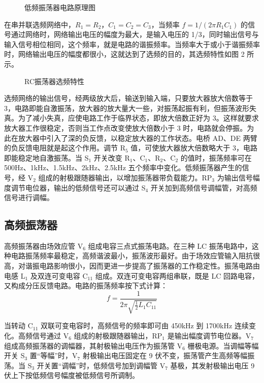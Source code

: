 \documentclass[12pt,UTF8]{ctexbook}
\begin{document}
	\begin{figure}[H]
		\centering
		\caption{低频振荡器电路原理图}
		\label{fig:low_freq_osc}
	\end{figure}
	
	在串并联选频网络中，\(R_1=R_2\)，\(C_1=C_2=C_3\)，当频率 \(f=1/(2\pi R_1C_1)\) 的信号通过网络时，网络输出电压的幅度为最大，是输入电压的 1/3，同时输出信号与输入信号相位相同，这个频率，就是电路的谐振频率。当频率大于或小于谐振频率时，网络输出电压的幅度都很小，这就达到了选频的目的，其选频特性如图 2 所示。
	
	\begin{figure}[H]
		\centering
		\caption{RC振荡器选频特性}
		\label{fig:rc_response}
	\end{figure}
	
	选频网络的输出信号，经两级放大后，输送到输入端，只要放大器放大倍数等于 3，电路即能自激振荡，放大器的放大量大一些，对振荡起振有利，但振荡波形失真。为了减小失真，应使电路工作于临界状态，即放大倍数正好为 3。这样就要求放大器工作很稳定，否则当工作点改变使放大倍数小于 3 时，电路就会停振。为此在放大器中引入了深的负反馈，以稳定放大器的工作状态。电桥 AD、DE 两臂的负反馈电阻就是起这个作用。调节 R\(_5\) 值，可使放大器放大倍数略大于 3，电路即能稳定地自激振荡。当 S\(_1\) 开关改变 R\(_1\)、C\(_1\)、R\(_2\)、C\(_2\) 的值时，振荡频率可在 500Hz、1kHz、1.5kHz、2kHz、2.5kHz 五个频率中变化。低频振荡器产生的信号，经 V\(_2\) 组成的射极跟随器输出，以增加振荡器带负载能力。RP\(_3\) 为输出信号幅度调节电位器，输出的低频信号还可以通过 S\(_4\) 开关加到高频信号调幅管，对高频信号进行调幅。
	
	\subsection{高频振荡器}
	高频振荡器由场效应管 V\(_6\) 组成电容三点式振荡电路。在三种 LC 振荡电路中，这种电路振荡频率最稳定，高频谐波最小，振荡波形最好。由于场效应管输入阻抗很高，对谐振电路影响很小，因而更进一步提高了振荡器的工作稳定性。振荡电路由电感 L\(_1\) 及双连可变电容 C\(_{11}\) 组成。双连可变电容两组串联，既是 LC 回路电容，又构成分压反馈电路。电路的振荡频率按下式计算：
	\[
	f = \frac{1}{2\pi \sqrt{\frac{1}{2} L_1 C_{11}}}
	\]
	
	当转动 C\(_{11}\) 双联可变电容时，高频信号的频率即可由 450kHz 到 1700kHz 连续变化。高频信号通过 V\(_6\) 组成的射极跟随器输出，RP\(_1\) 是输出幅度调节电位器。V\(_7\) 组成高频振荡器的调幅器，其射极输出电压作为振荡管 V\(_6\) 栅极电源。当调幅等幅开关 S\(_3\) 置“等幅”时，V\(_7\) 射极输出电压固定在 9 伏不变，振荡管产生高频等幅振荡。当 S\(_3\) 开关置“调幅”时，低频信号加到调幅管 V\(_7\) 基极，其发射极输出电压 9 伏上下按低频信号幅度被低频信号所调制。
	
\end{document}
